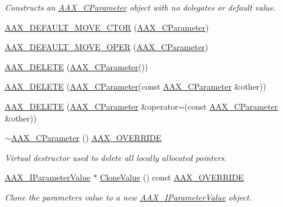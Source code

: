\begin{DoxyCompactItemize}
\begin{DoxyCompactList}\small\item\em Constructs an \mbox{\hyperlink{a01537}{A\+A\+X\+\_\+\+C\+Parameter}} object with no delegates or default value. \end{DoxyCompactList}\item 
\mbox{\hyperlink{a01537_a580ce7701ad95682e19e921219fb9dc7}{A\+A\+X\+\_\+\+D\+E\+F\+A\+U\+L\+T\+\_\+\+M\+O\+V\+E\+\_\+\+C\+T\+OR}} (\mbox{\hyperlink{a01537}{A\+A\+X\+\_\+\+C\+Parameter}})
\item 
\mbox{\hyperlink{a01537_a8bb6096dc8908ba8ec8070bc2884f98a}{A\+A\+X\+\_\+\+D\+E\+F\+A\+U\+L\+T\+\_\+\+M\+O\+V\+E\+\_\+\+O\+P\+ER}} (\mbox{\hyperlink{a01537}{A\+A\+X\+\_\+\+C\+Parameter}})
\item 
\mbox{\hyperlink{a01537_a1d2644a9817d469b788596529842f58d}{A\+A\+X\+\_\+\+D\+E\+L\+E\+TE}} (\mbox{\hyperlink{a01537}{A\+A\+X\+\_\+\+C\+Parameter}}())
\item 
\mbox{\hyperlink{a01537_a9cac0f573154fab57b963e0e6f43d96d}{A\+A\+X\+\_\+\+D\+E\+L\+E\+TE}} (\mbox{\hyperlink{a01537}{A\+A\+X\+\_\+\+C\+Parameter}}(const \mbox{\hyperlink{a01537}{A\+A\+X\+\_\+\+C\+Parameter}} \&other))
\item 
\mbox{\hyperlink{a01537_ad52217842fab274984e0e5edd8344f3a}{A\+A\+X\+\_\+\+D\+E\+L\+E\+TE}} (\mbox{\hyperlink{a01537}{A\+A\+X\+\_\+\+C\+Parameter}} \&operator=(const \mbox{\hyperlink{a01537}{A\+A\+X\+\_\+\+C\+Parameter}} \&other))
\item 
\mbox{\hyperlink{a01537_a4f78668b1bb9aa03ac8f06cb9205fef6}{$\sim$\+A\+A\+X\+\_\+\+C\+Parameter}} () \mbox{\hyperlink{a00392_ac2f24a5172689ae684344abdcce55463}{A\+A\+X\+\_\+\+O\+V\+E\+R\+R\+I\+DE}}
\begin{DoxyCompactList}\small\item\em Virtual destructor used to delete all locally allocated pointers. \end{DoxyCompactList}\item 
\mbox{\hyperlink{a01853}{A\+A\+X\+\_\+\+I\+Parameter\+Value}} $\ast$ \mbox{\hyperlink{a01537_a7677ba568ddf62f7393ea76c154dc397}{Clone\+Value}} () const \mbox{\hyperlink{a00392_ac2f24a5172689ae684344abdcce55463}{A\+A\+X\+\_\+\+O\+V\+E\+R\+R\+I\+DE}}
\begin{DoxyCompactList}\small\item\em Clone the parameter\textquotesingle{}s value to a new \mbox{\hyperlink{a01853}{A\+A\+X\+\_\+\+I\+Parameter\+Value}} object. \end{DoxyCompactList}\item 

\end{DoxyCompactItemize}

